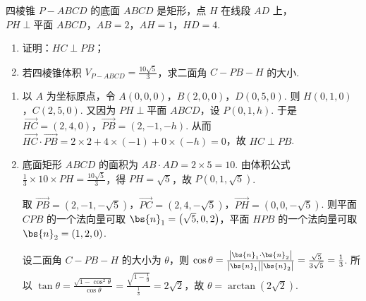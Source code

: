 \documentclass[UTF8,a4paper,oneside,11pt]{ctexbook}
\begin{document}
\begin{problem}
四棱锥 \( P-ABCD \) 的底面 \(ABCD\) 是矩形，点 \(H\) 在线段 \(AD\) 上，\( PH\perp\text{平面 }ABCD \)，\( AB=2 \)，\( AH=1 \)，\( HD=4 \).

\begin{enumerate}
\item 证明：\( HC \perp PB \)；
\item 若四棱锥体积 \( V_{P-ABCD}=\frac{10\sqrt{5}}{3} \)，求二面角 \( C-PB-H \) 的大小.
\end{enumerate}

\end{problem}

\begin{solution}
\begin{enumerate}
\item 以 \(A\) 为坐标原点，令
\( A\left( 0,0,0 \right) \)，\( B\left( 2,0,0 \right) \)，\( D\left( 0,5,0 \right) \). 则
\( H\left( 0,1,0 \right) \)，\( C\left( 2,5,0 \right) \). 又因为 \( PH\perp\text{平面 }ABCD \)，设 \( P\left( 0,1,h \right) \).
于是 \( \overrightarrow{HC}=\left( 2,4,0 \right) \)，\( \overrightarrow{PB}=\left( 2,-1,-h \right) \). 从而 \( \overrightarrow{HC}\cdot \overrightarrow{PB}=2\times 2+4\times \left( -1 \right)+0\times \left( -h \right)=0 \)，故 \( HC\perp PB \).

\item 底面矩形 \(ABCD\) 的面积为 \( AB\cdot AD=2\times 5=10 \). 由体积公式 \( \frac{1}{3}\times 10\times PH=\frac{10\sqrt{5}}{3} \)，得 \( PH=\sqrt{5} \)，故 \( P\left( 0,1,\sqrt{5} \right) \).

取 \( \overrightarrow{PB}=\left( 2,-1,-\sqrt{5} \right) \)，\( \overrightarrow{PC}=\left( 2,4,-\sqrt{5} \right) \)，\( \overrightarrow{PH}=\left( 0,0,-\sqrt{5} \right) \). 则平面 \(CPB\) 的一个法向量可取 \( \bs{n}_1=\left( \sqrt{5},0,2 \right) \)，平面 \(HPB\) 的一个法向量可取 \( \bs{n}_2=\left( 1,2,0 \right) \).

设二面角 \( C-PB-H \) 的大小为 \( \theta \)，则 \( \cos \theta=\frac{\left| \bs{n}_1\cdot \bs{n}_2 \right|}{\left| \bs{n}_1 \right|\left| \bs{n}_2 \right|}=\frac{\sqrt{5}}{3\sqrt{5}}=\frac{1}{3} \). 所以 \( \tan \theta=\frac{\sqrt{1-\cos^2\theta}}{\cos \theta}=\frac{\sqrt{1-\frac{1}{9}}}{\frac{1}{3}}=2\sqrt{2} \)，故 \( \theta=\arctan\left( 2\sqrt{2} \right) \).
\end{enumerate}
\end{solution}
\end{document}
